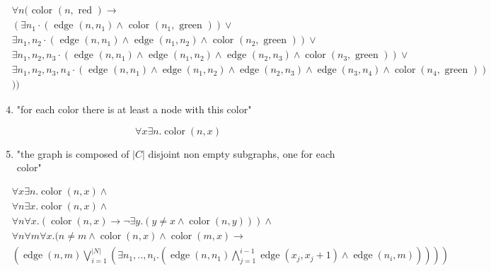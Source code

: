 \begin{sol}
$$
\begin{aligned}
& \forall n(\text { color }(n, \text { red }) \rightarrow \\
& \left(\exists n_{1} \cdot\left(\text { edge }\left(n, n_{1}\right) \wedge \text { color }\left(n_{1}, \text { green }\right)\right) \vee\right. \\
& \exists n_{1}, n_{2} \cdot\left(\text { edge }\left(n, n_{1}\right) \wedge \text { edge }\left(n_{1}, n_{2}\right) \wedge \text { color }\left(n_{2}, \text { green }\right)\right) \vee \\
& \exists n_{1}, n_{2}, n_{3} \cdot\left(\text { edge }\left(n, n_{1}\right) \wedge \text { edge }\left(n_{1}, n_{2}\right) \wedge \text { edge }\left(n_{2}, n_{3}\right) \wedge \operatorname{color}\left(n_{3}, \text { green }\right)\right) \vee \\
& \exists n_{1}, n_{2}, n_{3}, n_{4} \cdot\left(\text { edge }\left(n, n_{1}\right) \wedge \operatorname{edge}\left(n_{1}, n_{2}\right) \wedge \operatorname{edge}\left(n_{2}, n_{3}\right) \wedge \operatorname{edge}\left(n_{3}, n_{4}\right) \wedge \operatorname{color}\left(n_{4}, \text { green }\right)\right) \\
& ))
\end{aligned}
$$

\begin{enumerate}
  \setcounter{enumi}{3}
  \item "for each color there is at least a node with this color"
\end{enumerate}

$$
\forall x \exists n . \operatorname{color}(n, x)
$$

\begin{enumerate}
  \setcounter{enumi}{4}
  \item "the graph is composed of $|C|$ disjoint non empty subgraphs, one for each color"
\end{enumerate}

$$
\begin{aligned}
& \forall x \exists n . \operatorname{color}(n, x) \wedge \\
& \forall n \exists x . \operatorname{color}(n, x) \wedge \\
& \forall n \forall x .(\operatorname{color}(n, x) \rightarrow \neg \exists y .(y \neq x \wedge \operatorname{color}(n, y))) \wedge \\
& \forall n \forall m \forall x .(n \neq m \wedge \operatorname{color}(n, x) \wedge \operatorname{color}(m, x) \rightarrow \\
& \left.\left(\operatorname{edge}(n, m) \bigvee_{i=1}^{|N|}\left(\exists n_{1}, . ., n_{i} .\left(\operatorname{edge}\left(n, n_{1}\right) \bigwedge_{j=1}^{i-1} \operatorname{edge}\left(x_{j}, x_{j}+1\right) \wedge \operatorname{edge}\left(n_{i}, m\right)\right)\right)\right)\right)
\end{aligned}
$$
\end{sol}

